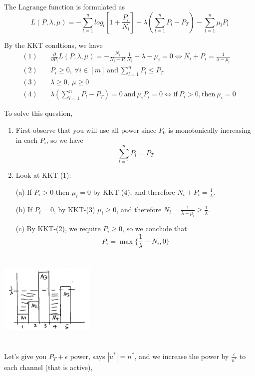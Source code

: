 The Lagrange function is formulated as
$$L(P, \lambda, \mu) = -\sum^n_{l=1}log_l[1+\frac{P_l}{N_l}] + \lambda(\sum^n_{l=1}P_l-P_T) - \sum^n_{l=1}\mu_lP_l $$

By the KKT condtions, we have
\begin{align*}
(1)\quad &\frac{\partial}{\partial P_i}L(P, \lambda, \mu) = -\frac{N_i}{N_i+P_i}\frac{1}{N_i} + \lambda - \mu_i = 0 \Leftrightarrow N_i+P_i = \frac{1}{\lambda-\mu_i}\\
(2)\quad &P_i \geq 0,\ \forall i\in[m]\ \text{and}\ \sum^n_{l=1}P_l \leq P_T\\
(3)\quad &\lambda\geq 0,\ \mu\geq 0\\
(4)\quad &\lambda(\sum^n_{l=1}P_l - P_T) = 0\ \text{and}\ \mu_iP_i = 0\Leftrightarrow \text{if}\ P_i > 0, \text{then}\ \mu_i =0\ 
\end{align*}

To solve this question,
\begin{enumerate}
	\item First observe that you will use all power since $F_0$ is monotonically increasing in each $P_i$, so we have
	$$\sum^n_{l=1}P_l = P_T$$
	
	\item Look at KKT-(1):
	
	(a) If $P_i>0$ then $\mu_i = 0$ by KKT-(4), and therefore $N_i+P_i = \frac{1}{\lambda}$.
	
	(b) If $P_i= 0$, by KKT-(3) $\mu_i\ge 0$, and therefore $N_i = \frac{1}{\lambda - \mu_i}\geq \frac{1}{\lambda}$.
	
	(c) By KKT-(2), we require $P_i\geq 0$, so we conclude that 
	$$P_i = \max\{\frac{1}{\lambda}-N_i, 0 \}$$
\end{enumerate}
\begin{marginfigure}
	\centering
	\includegraphics[width=1.8in,height=1.8in]{figures/ch10/figure1204_2.png}
\end{marginfigure}

\vspace{0.3cm}
Let's give you $P_T+\epsilon$ power, says $|u^*| = n^*$, and we increase the power by $\frac{\epsilon}{n^*}$ to each channel (that is active),

